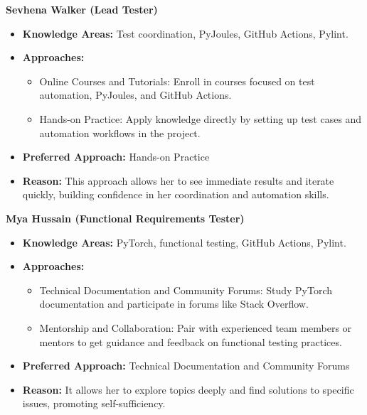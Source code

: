 \documentclass[12pt, titlepage]{article}
\begin{document}
\begin{appendices}
\begin{itemize}
        \textbf{Sevhena Walker (Lead Tester)}
        \begin{itemize}
          \item \textbf{Knowledge Areas:} Test coordination,
            PyJoules, GitHub Actions, Pylint.
          \item \textbf{Approaches:}
            \begin{itemize}
              \item Online Courses and Tutorials: Enroll in courses
                focused on test automation, PyJoules, and GitHub Actions.
              \item Hands-on Practice: Apply knowledge directly by
                setting up test cases and automation workflows in the project.
            \end{itemize}
          \item \textbf{Preferred Approach:} Hands-on Practice
          \item \textbf{Reason:} This approach allows her to see
            immediate results and iterate quickly, building
            confidence in her coordination and automation skills.
        \end{itemize}

        \textbf{Mya Hussain (Functional Requirements Tester)}
        \begin{itemize}
          \item \textbf{Knowledge Areas:} PyTorch, functional
            testing, GitHub Actions, Pylint.
          \item \textbf{Approaches:}
            \begin{itemize}
              \item Technical Documentation and Community Forums:
                Study PyTorch documentation and participate in forums
                like Stack Overflow.
              \item Mentorship and Collaboration: Pair with
                experienced team members or mentors to get guidance
                and feedback on functional testing practices.
            \end{itemize}
          \item \textbf{Preferred Approach:} Technical Documentation
            and Community Forums
          \item \textbf{Reason:} It allows her to explore topics
            deeply and find solutions to specific issues, promoting
            self-sufficiency.
        \end{itemize}


\end{itemize}
\end{appendices}
\end{document}
